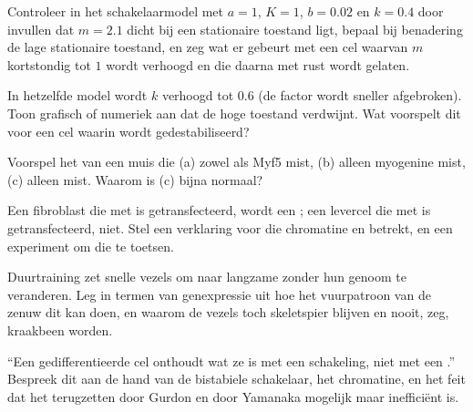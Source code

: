 \begin{exercise}[$\star\star$]\label{exo:b2:cell-differentiation:7}
Controleer in het schakelaarmodel met $a = 1$, $K = 1$, $b = 0.02$ en
$k = 0.4$ door invullen dat $m = 2.1$ dicht bij een stationaire toestand
ligt, bepaal bij benadering de lage stationaire toestand, en zeg wat er
gebeurt met een cel waarvan $m$ kortstondig tot $1$ wordt verhoogd en
die daarna met rust wordt gelaten.
\end{exercise}

\begin{exercise}[$\star\star$]\label{exo:b2:cell-differentiation:8}
In hetzelfde model wordt $k$ verhoogd tot $0.6$ (de factor wordt sneller
afgebroken). Toon grafisch of numeriek aan dat de hoge toestand verdwijnt.
Wat voorspelt dit voor een cel waarin  wordt gedestabiliseerd?
\end{exercise}

\begin{exercise}[$\star\star$]\label{exo:b2:cell-differentiation:9}
Voorspel het  van een muis die (a) zowel  als Myf5 mist,
(b) alleen myogenine mist, (c) alleen  mist. Waarom is (c) bijna normaal?
\end{exercise}

\begin{exercise}[$\star\star\star$]\label{exo:b2:cell-differentiation:10}
Een fibroblast die met  is getransfecteerd, wordt een ; een
levercel die met  is getransfecteerd, niet. Stel een verklaring voor die
chromatine en  betrekt, en een experiment om die te toetsen.
\end{exercise}

\begin{exercise}[$\star\star\star$]\label{exo:b2:cell-differentiation:11}
Duurtraining zet snelle vezels om naar langzame zonder hun genoom te
veranderen. Leg in termen van genexpressie uit hoe het vuurpatroon van de
zenuw dit kan doen, en waarom de vezels toch skeletspier blijven en nooit,
zeg, kraakbeen worden.
\end{exercise}

\begin{exercise}[$\star\star\star$]\label{exo:b2:cell-differentiation:12}
``Een gedifferentieerde cel onthoudt wat ze is met een schakeling, niet met
een .'' Bespreek dit aan de hand van de bistabiele schakelaar, het
chromatine, en het feit dat het terugzetten door Gurdon en door Yamanaka
mogelijk maar inefficiënt is.
\end{exercise}

